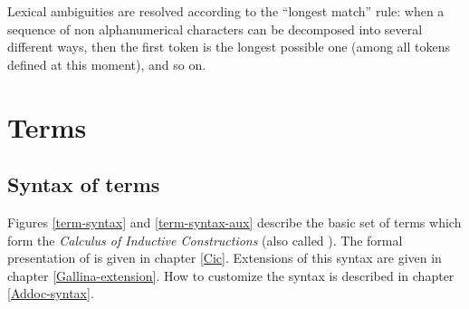 Lexical ambiguities are resolved according to the ``longest match''
rule: when a sequence of non alphanumerical characters can be decomposed
into several different ways, then the first token is the longest
possible one (among all tokens defined at this moment), and so on.

\section{Terms \label{term}}

\subsection{Syntax of terms}

Figures \ref{term-syntax} and \ref{term-syntax-aux} describe the basic
set of terms which form the {\em Calculus of Inductive Constructions}
(also called \CIC). The formal presentation of {\CIC} is given in
chapter \ref{Cic}. Extensions of this syntax are given in chapter
\ref{Gallina-extension}. How to customize the syntax is described in
chapter \ref{Addoc-syntax}.

